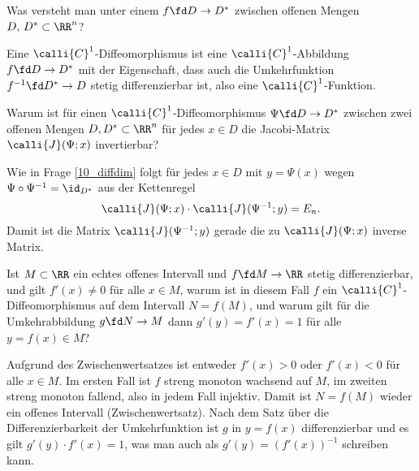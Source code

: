 \begin{frage}\label{10_diffeodef}
  Was versteht man unter einem 
  $f\fd D \to D^*$ zwischen offenen Mengen 
  $D, \, D^* \subset \RR^n$?
\end{frage}

\begin{antwort}
  Eine $\calli{C}^1$-Diffeomorphismus ist eine  
  $\calli{C}^1$-Abbildung $f\fd D\to D^*$ mit der Eigenschaft, dass auch 
  die Umkehrfunktion $f^{-1} \fd D^* \to D$ stetig differenzierbar ist, 
  also eine $\calli{C}^1$-Funktion.
  \AntEnd
\end{antwort}

\begin{frage}
  Warum ist für einen $\calli{C}^1$-Diffeomorphismus $\Psi \fd D\to D^*$ 
  zwischen zwei offenen Mengen $D, D^* \subset \RR^n$ 
  für jedes $x\in D$ die Jacobi-Matrix $\calli{J}( \Psi; x)$ invertierbar?
\end{frage}

\begin{antwort}
  Wie in Frage \ref{10_diffdim} folgt für jedes 
  $x\in D$ mit $y=\Psi(x)$ wegen $\Psi \circ \Psi^{-1}=\id_{D^*}$ 
  aus der Kettenregel
  \[
  \calli{ J }(\Psi ; x) \cdot \calli{ J }( \Psi^{-1}; y ) = E_n.
  \]
  Damit ist die Matrix $\calli{J}( \Psi^{-1}; y )$ gerade die zu 
  $\calli{J}( \Psi; x )$ inverse Matrix. \AntEnd
\end{antwort}

\begin{frage}
  Ist $M\subset\RR$ ein echtes offenes Intervall und $f\fd M\to \RR$ stetig 
  differenzierbar, und gilt $f'(x)\not=0$ für alle $x\in M$, warum ist in 
  diesem Fall $f$ ein $\calli{C}^1$-Diffeomorphismus 
  auf dem Intervall $N=f(M)$, und warum 
  gilt für die Umkehrabbildung $g \fd N\to M$ dann $g'(y)=f'(x)=1$ 
  für alle $y=f(x)\in M$?
\end{frage}

\begin{antwort}
  Aufgrund des Zwischenwertsatzes ist entweder $f'(x)>0$  
  oder $f'(x)< 0$ für alle $x\in M$. Im ersten Fall ist $f$ streng monoton 
  wachsend auf $M$, im zweiten streng monoton fallend, also in jedem Fall 
  injektiv. Damit ist $N=f(M)$ wieder ein offenes Intervall (Zwischenwertsatz). 
  Nach dem Satz über die Differenzierbarkeit der Umkehrfunktion ist $g$ in 
  $y=f(x)$ differenzierbar und es gilt $g'(y)\cdot f'(x)=1$, was man auch als 
  $g'(y)=\left( f'(x) \right)^{-1}$ schreiben kann.
  \AntEnd
\end{antwort}

